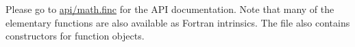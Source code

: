 Please go to \hyperlink{math_8finc}{api/math.\+finc} for the A\+P\+I documentation. Note that many of the elementary functions are also available as Fortran intrinsics. The file also contains constructors for function objects. 